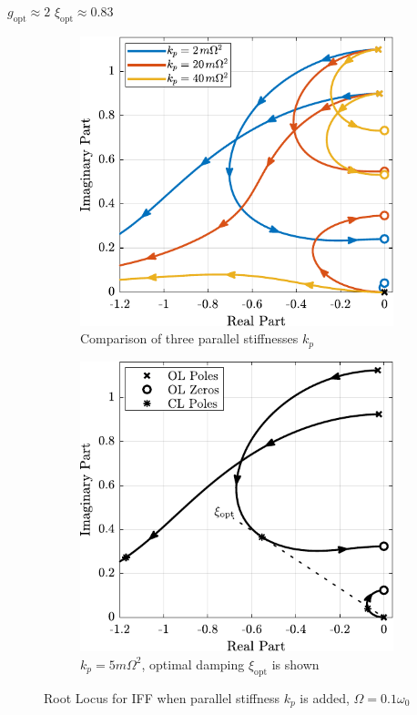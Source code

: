 \documentclass{ISMA_USD2020}
\begin{document}
\(g_{\text{opt}} \approx 2\)
\(\xi_{\text{opt}} \approx 0.83\)

\begin{figure}[htbp]
\begin{subfigure}[c]{0.49\linewidth}
\includegraphics[width=\linewidth]{figs/root_locus_iff_kps.pdf}
\caption{\label{fig:root_locus_iff_kps} Comparison of three parallel stiffnesses \(k_p\)}
\end{subfigure}
\begin{subfigure}[c]{0.49\linewidth}
\includegraphics[width=\linewidth]{figs/root_locus_opt_gain_iff_kp.pdf}
\caption{\label{fig:root_locus_opt_gain_iff_kp} \(k_p = 5 m \Omega^2\), optimal damping \(\xi_\text{opt}\) is shown}
\end{subfigure}
\caption{\label{fig:root_locus_iff_kps_opt}Root Locus for IFF when parallel stiffness \(k_p\) is added, \(\Omega = 0.1 \omega_0\)}
\centering
\end{figure}
\end{document}
